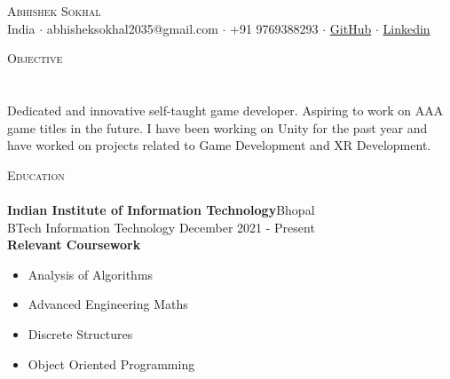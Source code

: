 \documentclass[a4paper]{article}
\newcommand{\lineunder} {
    \vspace*{-8pt} \\
    \hspace*{-18pt} \hrulefill \\
}
\newcommand{\header} [1] {
    {\hspace*{-18pt}\vspace*{6pt} \textsc{#1}}
    \vspace*{-6pt} \lineunder
}
\begin{document}
\vspace*{-40pt}

    

\vspace*{-9pt}
\begin{center}
	{\Huge \scshape {Abhishek Sokhal}}\\
	\vspace{2mm}
	India $\cdot$ abhisheksokhal2035@gmail.com $\cdot$ +91 9769388293 $\cdot$ \href{https://github.com/Distroto}{GitHub} $\cdot$ \href{https://www.linkedin.com/in/abhishek-sokhal-630a951ba/}{Linkedin} \\
\end{center}
\vspace{-1mm}
\header{Objective}
\vspace{-2mm}
\textbf{}\\
Dedicated and innovative self-taught game developer. Aspiring to work on AAA game titles in the future. I have been working on Unity for the past year and have worked on projects related to Game Development and XR Development.
\\
\vspace{2mm}
\header{Education}
\vspace{0mm}
\textbf{Indian Institute of Information Technology}\hfill Bhopal\\
BTech Information Technology \hfill December 2021 - Present\\
\vspace{1mm}
\textbf{Relevant Coursework}
\vspace{-2.5mm}
 \begin{multicols}{2}
    \begin{itemize}
        \item Analysis of Algorithms
         \vspace{-2.5mm}
        \item Advanced Engineering Maths 
         \vspace{-2.5mm}
        \item Discrete Structures 
         \vspace{-2.5mm}
        \item Object Oriented Programming
         \vspace{-2.5mm}
        
    \end{itemize}
    \end{multicols}
\end{document}
